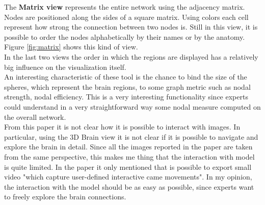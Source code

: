 \documentclass{article}
\begin{document}
\begin{multicols}{2}

The \textbf{Matrix view} represents the entire network using the adjacency matrix. Nodes are positioned along the sides of a square matrix. Using colors each cell represent how strong the connection between two nodes is. Still in this view, it is possible to order the nodes alphabetically by their names or by the anatomy. Figure \ref{fig:matrix} shows this kind of view.\\


In the last two views the order in which the regions are displayed has a relatively big influence on the visualization itself. \\
An interesting characteristic of these tool is the chance to bind the size of the spheres, which represent the brain regions, to some graph metric such as nodal strength, nodal efficiency. This is a very interesting functionality since experts could understand in a very straightforward way some nodal measure computed on the overall network.\\
From this paper it is not clear how it is possible to interact with images. In particular, using the 3D Brain view it is not clear if it is possible to navigate and explore the brain in detail. Since all the images reported in the paper are taken from the same perspective, this makes me thing that the interaction with model is quite limited. In the paper it only mentioned that is possible to export small video "which capture user-defined interactive came movements". In my opinion, the interaction with the model should be as easy as possible, since experts want to freely explore the brain connections. 


\end{multicols}
\end{document}
